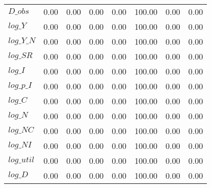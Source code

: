 \begin{center}
\begin{longtable}{lccccccc}
$D\_obs     $	 & 	        0.00	 & 	        0.00	 & 	        0.00	 & 	        0.00	 & 	      100.00	 & 	        0.00	 & 	        0.00 \\ 
$log\_Y     $	 & 	        0.00	 & 	        0.00	 & 	        0.00	 & 	        0.00	 & 	      100.00	 & 	        0.00	 & 	        0.00 \\ 
$log\_Y\_N  $	 & 	        0.00	 & 	        0.00	 & 	        0.00	 & 	        0.00	 & 	      100.00	 & 	        0.00	 & 	        0.00 \\ 
$log\_SR    $	 & 	        0.00	 & 	        0.00	 & 	        0.00	 & 	        0.00	 & 	      100.00	 & 	        0.00	 & 	        0.00 \\ 
$log\_I     $	 & 	        0.00	 & 	        0.00	 & 	        0.00	 & 	        0.00	 & 	      100.00	 & 	        0.00	 & 	        0.00 \\ 
$log\_p\_I  $	 & 	        0.00	 & 	        0.00	 & 	        0.00	 & 	        0.00	 & 	      100.00	 & 	        0.00	 & 	        0.00 \\ 
$log\_C     $	 & 	        0.00	 & 	        0.00	 & 	        0.00	 & 	        0.00	 & 	      100.00	 & 	        0.00	 & 	        0.00 \\ 
$log\_N     $	 & 	        0.00	 & 	        0.00	 & 	        0.00	 & 	        0.00	 & 	      100.00	 & 	        0.00	 & 	        0.00 \\ 
$log\_NC    $	 & 	        0.00	 & 	        0.00	 & 	        0.00	 & 	        0.00	 & 	      100.00	 & 	        0.00	 & 	        0.00 \\ 
$log\_NI    $	 & 	        0.00	 & 	        0.00	 & 	        0.00	 & 	        0.00	 & 	      100.00	 & 	        0.00	 & 	        0.00 \\ 
$log\_util  $	 & 	        0.00	 & 	        0.00	 & 	        0.00	 & 	        0.00	 & 	      100.00	 & 	        0.00	 & 	        0.00 \\ 
$log\_D     $	 & 	        0.00	 & 	        0.00	 & 	        0.00	 & 	        0.00	 & 	      100.00	 & 	        0.00	 & 	        0.00 \\ 
\end{longtable}
 \end{center}
